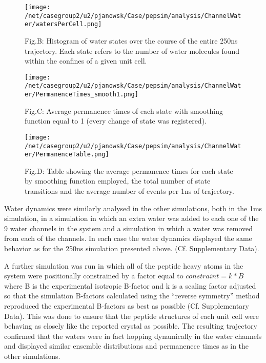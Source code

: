 \documentclass[12pt,letterpaper]{report}
\begin{document}
\begin{enumerate}
	\begin{figure}[H]
	\centering
	\texttt{[image: /net/casegroup2/u2/pjanowsk/Case/pepsim/analysis/ChannelWater/watersPerCell.png]}
	\caption{Fig.B: Histogram of water states over the course of the entire 250ns trajectory. Each state refers to the number of water molecules found within the confines of a given unit cell.}
	\end{figure}

	\begin{figure}[H]
	\centering
	\texttt{[image: /net/casegroup2/u2/pjanowsk/Case/pepsim/analysis/ChannelWater/PermanenceTimes\_smooth1.png]}
	\caption{Fig.C: Average permanence times of each state with smoothing function equal to 1 (every change of state was registered).}
	\end{figure}
	
	\begin{figure}[H]
	\centering
	\texttt{[image: /net/casegroup2/u2/pjanowsk/Case/pepsim/analysis/ChannelWater/PermanenceTable.png]}
	\caption{Fig.D: Table showing the average permanence times for each state by smoothing function employed, the total number of state transitions and the average number of events per 1ns of trajectory.}
	\end{figure}

Water dynamics were similarly analysed in the other simulations, both in the 1ms simulation, in a simulation in which an extra water was added to each one of the 9 water channels in the system and a simulation in which a water was removed from each of the channels. In each case the water dynamics displayed the same behavior as for the 250ns simulation presented above. (Cf. Supplementary Data).

A further simulation was run in which all of the peptide heavy atoms in the system were positionally constrained by a factor equal to
$constraint=k*B$
where B is the experimental isotropic B-factor and k is a scaling factor adjusted so that the simulation B-factors calculated using the ``reverse symmetry'' method reproduced the experimental B-factors as best as possible (Cf. Supplementary Data). This was done to ensure that the peptide structures of each unit cell were behaving as closely like the reported crystal as possible. The resulting trajectory confirmed that the waters were in fact hopping dynamically in the water channels and displayed similar ensemble distributions and permanenece times as in the other simulations.


\end{enumerate}
\end{document}
